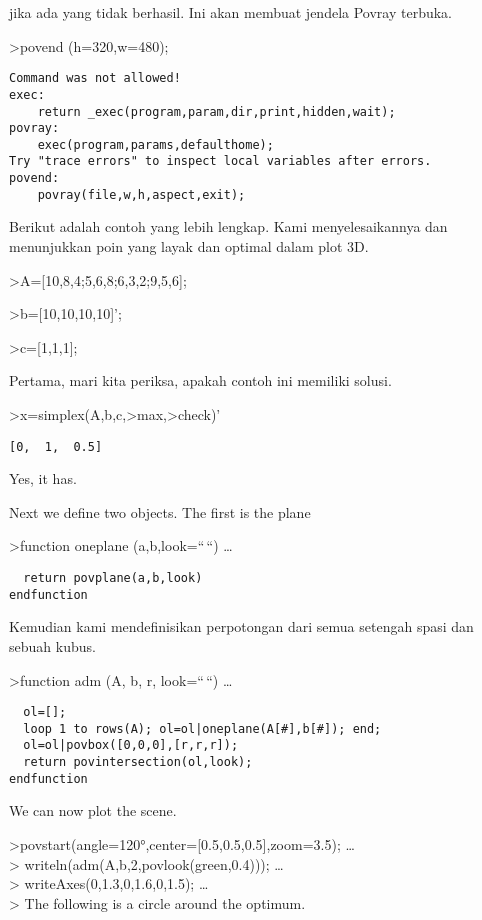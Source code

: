 \documentclass[
]{book}
\begin{document}
jika ada yang tidak berhasil. Ini akan membuat jendela Povray terbuka.

\textgreater povend (h=320,w=480);

\begin{verbatim}
Command was not allowed!
exec:
    return _exec(program,param,dir,print,hidden,wait);
povray:
    exec(program,params,defaulthome);
Try "trace errors" to inspect local variables after errors.
povend:
    povray(file,w,h,aspect,exit); 
\end{verbatim}

Berikut adalah contoh yang lebih lengkap. Kami menyelesaikannya dan menunjukkan poin yang layak dan optimal dalam plot 3D.

\textgreater A={[}10,8,4;5,6,8;6,3,2;9,5,6{]};

\textgreater b={[}10,10,10,10{]}';

\textgreater c={[}1,1,1{]};

Pertama, mari kita periksa, apakah contoh ini memiliki solusi.

\textgreater x=simplex(A,b,c,\textgreater max,\textgreater check)'

\begin{verbatim}
[0,  1,  0.5]
\end{verbatim}

Yes, it has.

Next we define two objects. The first is the plane

\textgreater function oneplane (a,b,look=``\,``) \ldots{}

\begin{verbatim}
  return povplane(a,b,look)
endfunction
\end{verbatim}

Kemudian kami mendefinisikan perpotongan dari semua setengah spasi dan sebuah kubus.

\textgreater function adm (A, b, r, look=``\,``) \ldots{}

\begin{verbatim}
  ol=[];
  loop 1 to rows(A); ol=ol|oneplane(A[#],b[#]); end;
  ol=ol|povbox([0,0,0],[r,r,r]);
  return povintersection(ol,look);
endfunction
\end{verbatim}

We can now plot the scene.

\textgreater povstart(angle=120°,center={[}0.5,0.5,0.5{]},zoom=3.5); \ldots{}\\
\textgreater{} writeln(adm(A,b,2,povlook(green,0.4))); \ldots{}\\
\textgreater{} writeAxes(0,1.3,0,1.6,0,1.5); \ldots{}\\
\textgreater{} The following is a circle around the optimum.
\end{document}
